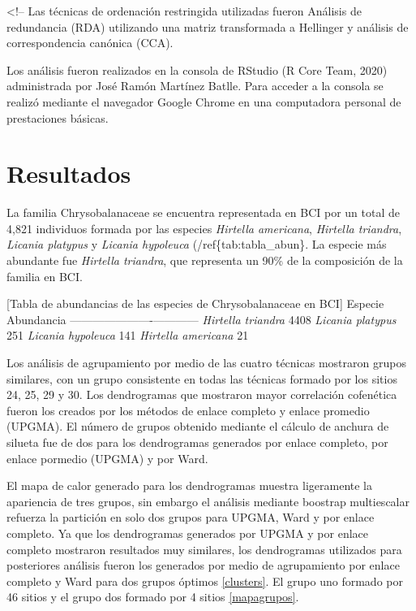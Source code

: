 \documentclass[11pt,]{article}
\begin{document}
\textless{}!-- Las técnicas de ordenación restringida utilizadas fueron
Análisis de redundancia (RDA) utilizando una matriz transformada a
Hellinger y análisis de correspondencia canónica (CCA).

Los análisis fueron realizados en la consola de RStudio (R Core Team,
2020) administrada por José Ramón Martínez Batlle. Para acceder a la
consola se realizó mediante el navegador Google Chrome en una
computadora personal de prestaciones básicas.

\section{Resultados}\label{resultados}

La familia Chrysobalanaceae se encuentra representada en BCI por un
total de 4,821 individuos formada por las especies \emph{Hirtella
americana}, \emph{Hirtella triandra}, \emph{Licania platypus} y
\emph{Licania hypoleuca} (/ref\{tab:tabla\_abun\}. La especie más
abundante fue \emph{Hirtella triandra}, que representa un 90\% de la
composición de la familia en BCI.

{[}Tabla de abundancias de las especies de Chrysobalanaceae en
BCI\label{tab:tabla_abun}{]} \textbar{} Especie \textbar{} Abundancia
\textbar{}
\textbar{}----------------------\textbar{}------------\textbar{}
\textbar{} \emph{Hirtella triandra} \textbar{} 4408 \textbar{}
\textbar{} \emph{Licania platypus} \textbar{} 251 \textbar{} \textbar{}
\emph{Licania hypoleuca} \textbar{} 141 \textbar{} \textbar{}
\emph{Hirtella americana} \textbar{} 21 \textbar{}

Los análisis de agrupamiento por medio de las cuatro técnicas mostraron
grupos similares, con un grupo consistente en todas las técnicas formado
por los sitios 24, 25, 29 y 30. Los dendrogramas que mostraron mayor
correlación cofenética fueron los creados por los métodos de enlace
completo y enlace promedio (UPGMA). El número de grupos obtenido
mediante el cálculo de anchura de silueta fue de dos para los
dendrogramas generados por enlace completo, por enlace pormedio (UPGMA)
y por Ward.

El mapa de calor generado para los dendrogramas muestra ligeramente la
apariencia de tres grupos, sin embargo el análisis mediante boostrap
multiescalar refuerza la partición en solo dos grupos para UPGMA, Ward y
por enlace completo. Ya que los dendrogramas generados por UPGMA y por
enlace completo mostraron resultados muy similares, los dendrogramas
utilizados para posteriores análisis fueron los generados por medio de
agrupamiento por enlace completo y Ward para dos grupos óptimos
\ref{clusters}. El grupo uno formado por 46 sitios y el grupo dos
formado por 4 sitios \ref{mapagrupos}.
\end{document}
